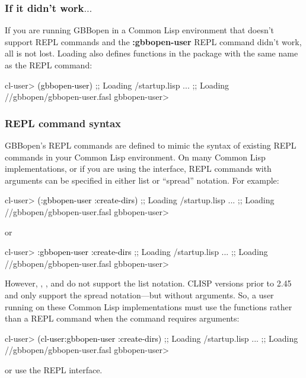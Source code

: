 \documentclass[10pt,twoside,english,pdftex]{article}
\begin{document}
\subsubsection*{If it didn't work$\ldots$}

If you are running GBBopen in a Common Lisp environment that doesn't support
REPL commands and the \textbf{:gbbopen-user} REPL command didn't
work, all is not lost.  Loading 
also defines functions in the  package with the same
name as the REPL command:
%
\W\supp
\begin{example}
\textcolor{darkergray}{%
  cl-user> \textcolor{black}{(gbbopen-user)}
  ;; Loading /startup.lisp
     ...
  ;; Loading //gbbopen/gbbopen-user.fasl
  gbbopen-user>}
\end{example}

\subsubsection*{REPL command syntax}
\label{sec:REPL-command-syntax}

GBBopen's REPL commands are defined to mimic the syntax of existing REPL
commands in your Common Lisp environment.  On many Common Lisp
implementations, or if you are using the
 interface, REPL
commands with arguments can be specified in either list or ``spread''
notation.  For example:
%
\W\supp
\begin{example}
\textcolor{darkergray}{%
  cl-user> \textcolor{black}{(:gbbopen-user :create-dirs)}
  ;; Loading /startup.lisp
     ...
  ;; Loading //gbbopen/gbbopen-user.fasl
  gbbopen-user>}
\end{example}
%
or
%
\W\supp\notpretop
\begin{example}
\textcolor{darkergray}{%
  cl-user> \textcolor{black}{:gbbopen-user :create-dirs}
  ;; Loading /startup.lisp
     ...
  ;; Loading //gbbopen/gbbopen-user.fasl
  gbbopen-user>}
\end{example}

However, ,
, and
 do not support the list
notation.  CLISP versions prior to 2.45 and
 only support the spread
notation---but without arguments.  So, a user running on these Common
Lisp implementations must use the  functions rather
than a REPL command when the command requires arguments:
%
\W\supp
\begin{example}
\textcolor{darkergray}{%
  cl-user> \textcolor{black}{(cl-user:gbbopen-user :create-dirs)}
  ;; Loading /startup.lisp
     ...
  ;; Loading //gbbopen/gbbopen-user.fasl
  gbbopen-user>}
\end{example}
%
or use the  REPL
interface.
\end{document}
